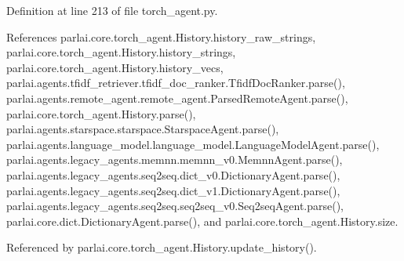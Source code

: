 Definition at line 213 of file torch\+\_\+agent.\+py.



References parlai.\+core.\+torch\+\_\+agent.\+History.\+history\+\_\+raw\+\_\+strings, parlai.\+core.\+torch\+\_\+agent.\+History.\+history\+\_\+strings, parlai.\+core.\+torch\+\_\+agent.\+History.\+history\+\_\+vecs, parlai.\+agents.\+tfidf\+\_\+retriever.\+tfidf\+\_\+doc\+\_\+ranker.\+Tfidf\+Doc\+Ranker.\+parse(), parlai.\+agents.\+remote\+\_\+agent.\+remote\+\_\+agent.\+Parsed\+Remote\+Agent.\+parse(), parlai.\+core.\+torch\+\_\+agent.\+History.\+parse(), parlai.\+agents.\+starspace.\+starspace.\+Starspace\+Agent.\+parse(), parlai.\+agents.\+language\+\_\+model.\+language\+\_\+model.\+Language\+Model\+Agent.\+parse(), parlai.\+agents.\+legacy\+\_\+agents.\+memnn.\+memnn\+\_\+v0.\+Memnn\+Agent.\+parse(), parlai.\+agents.\+legacy\+\_\+agents.\+seq2seq.\+dict\+\_\+v0.\+Dictionary\+Agent.\+parse(), parlai.\+agents.\+legacy\+\_\+agents.\+seq2seq.\+dict\+\_\+v1.\+Dictionary\+Agent.\+parse(), parlai.\+agents.\+legacy\+\_\+agents.\+seq2seq.\+seq2seq\+\_\+v0.\+Seq2seq\+Agent.\+parse(), parlai.\+core.\+dict.\+Dictionary\+Agent.\+parse(), and parlai.\+core.\+torch\+\_\+agent.\+History.\+size.



Referenced by parlai.\+core.\+torch\+\_\+agent.\+History.\+update\+\_\+history().

